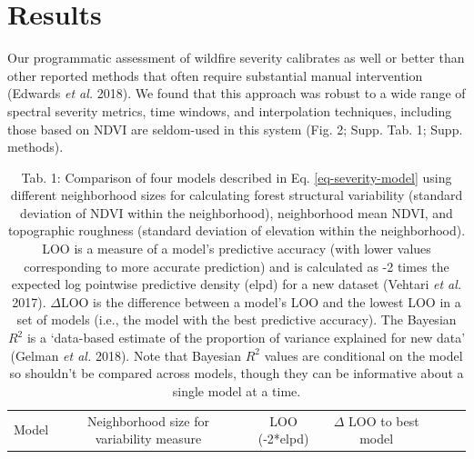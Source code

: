 \documentclass[]{article}
\begin{document}
\hypertarget{results}{%
\section{Results}\label{results}}

Our programmatic assessment of wildfire severity calibrates as well or
better than other reported methods that often require substantial manual
intervention (Edwards \emph{et al.} 2018). We found that this approach
was robust to a wide range of spectral severity metrics, time windows,
and interpolation techniques, including those based on NDVI are
seldom-used in this system (Fig. 2; Supp. Tab. 1; Supp. methods).

\begin{longtable}[]{@{}ccccccc@{}}
\caption{Tab. 1: Comparison of four models described in Eq.
\ref{eq-severity-model} using different neighborhood sizes for
calculating forest structural variability (standard deviation of NDVI
within the neighborhood), neighborhood mean NDVI, and topographic
roughness (standard deviation of elevation within the neighborhood). LOO
is a measure of a model's predictive accuracy (with lower values
corresponding to more accurate prediction) and is calculated as -2 times
the expected log pointwise predictive density (elpd) for a new dataset
(Vehtari \emph{et al.} 2017). \(\Delta\)LOO is the difference between a
model's LOO and the lowest LOO in a set of models (i.e., the model with
the best predictive accuracy). The Bayesian \(R^2\) is a `data-based
estimate of the proportion of variance explained for new data' (Gelman
\emph{et al.} 2018). Note that Bayesian \(R^2\) values are conditional
on the model so shouldn't be compared across models, though they can be
informative about a single model at a time.}\tabularnewline
\toprule
\begin{minipage}[b]{0.06\columnwidth}\centering
Model\strut
\end{minipage} & \begin{minipage}[b]{0.17\columnwidth}\centering
Neighborhood size for variability measure\strut
\end{minipage} & \begin{minipage}[b]{0.09\columnwidth}\centering
LOO (-2*elpd)\strut
\end{minipage} & \begin{minipage}[b]{0.11\columnwidth}\centering
\(\Delta\) LOO to best model\strut
\end{minipage} & \begin{minipage}[b]{0.11\columnwidth}\centering

\end{minipage}
\end{longtable}
\end{document}
